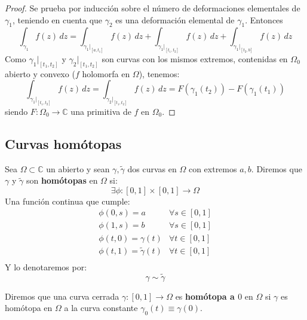 \begin{proof}
    Se prueba por inducción sobre el número de deformaciones elementales de $\gamma_1$, teniendo en cuenta que $\gamma_2$ es una deformación elemental de $\gamma_1$. Entonces
    \[
        \int_{\gamma_1} f(z) \, dz = \int_{\gamma_1|_{[a, t_1]}} f(z) \, dz + \int_{\gamma_1|_{[t_1, t_2]}} f(z) \, dz + \int_{\gamma_1|_{[t_2, b]}} f(z) \, dz 
    \]
    Como $\gamma_1 |_{[t_1, t_2]}$ y $\gamma_2 |_{[t_1, t_2]}$ son curvas con los mismos extremos, contenidas en $\Omega_0$ abierto y convexo ($f$ holomorfa en $\Omega$), tenemos:
    \[
        \int_{\gamma_1|_{[t_1, t_2]}} f(z) \, dz = \int_{\gamma_2|_{[t_1, t_2]}} f(z) \, dz = F(\gamma_1(t_2)) - F(\gamma_1(t_1))
    \]
    siendo $F : \Omega_0 \to \mathbb{C}$ una primitiva de $f$ en $\Omega_0$. 
\end{proof}

\subsection{Curvas homótopas}

\begin{definición}
    Sea $\Omega \subset \mathbb{C}$ un abierto y sean $\gamma, \tilde{\gamma}$ dos curvas en $\Omega$ con extremos $a,b$. Diremos que $\gamma$ y $\tilde{\gamma}$ son \textbf{homótopas} en $\Omega$ si:
    \[
    \exists \phi : [0,1] \times [0,1] \to \Omega
    \]   
    Una función continua que cumple:
    \[
    \begin{array}{rl}
        \phi(0, s) = a & \forall s \in [0,1] \\
        \phi(1, s) = b & \forall s \in [0,1] \\
        \phi(t, 0) = \gamma(t) & \forall t \in [0,1] \\
        \phi(t, 1) = \tilde{\gamma}(t) & \forall t \in [0,1] \\ 
    \end{array}
    \]
    Y lo denotaremos por:
    \[
    \gamma \sim \tilde{\gamma}
    \]
\end{definición}

\begin{definición}
    Diremos que una curva cerrada $\gamma : [0,1] \to \Omega$ es \textbf{homótopa a $0$} en $\Omega$ si $\gamma$ es homótopa en $\Omega$ a la curva constante $\gamma_0(t) \equiv \gamma(0)$.
\end{definición}


